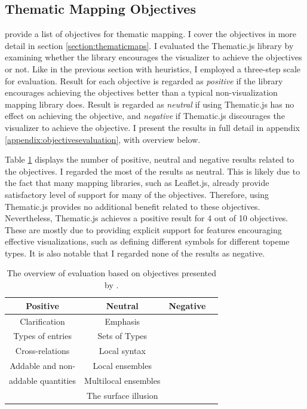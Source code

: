 \subsection{Thematic Mapping Objectives}

\citet{schlichtmann_visualization_2002} provide a list of objectives for thematic mapping. I cover the objectives in more detail in section \ref{section:thematicmaps}. I evaluated the Thematic.js library by examining whether the library encourages the visualizer to achieve the objectives or not. Like in the previous section with heuristics, I employed a three-step scale for evaluation. Result for each objective is regarded as \emph{positive} if the library encourages achieving the objectives better than a typical non-visualization mapping library does. Result is regarded as \emph{neutral} if using Thematic.js has no effect on achieving the objective, and \emph{negative} if Thematic.js discourages the visualizer to achieve the objective. I present the results in full detail in appendix \ref{appendix:objectivesevaluation}, with overview below.

Table \ref{table:objectivesevaluationoverview} displays the number of positive, neutral and negative results related to the objectives. I regarded the most of the results as neutral. This is likely due to the fact that many mapping libraries, such as Leaflet.js, already provide satisfactory level of support for many of the objectives. Therefore, using Thematic.js provides no additional benefit related to these objectives. Nevertheless, Thematic.js achieves a positive result for 4 out of 10 objectives. These are mostly due to providing explicit support for features encouraging effective visualizations, such as defining different symbols for different topeme types. It is also notable that I regarded none of the results as negative.

\begin{table}[htb]
\centering
\begin{tabular}{|c|c|c|c|}
\hline
\textbf{Positive} & \textbf{Neutral} & \textbf{Negative} \\ 
\hline
Clarification & Emphasis & \\
Types of entries & Sets of Types & \\
Cross-relations & Local syntax & \\
Addable and non- & Local ensembles & \\
addable quantities & Multilocal ensembles & \\
& The surface illusion & \\
\hline
\end{tabular}
\caption{The overview of evaluation based on objectives presented by \citet{schlichtmann_visualization_2002}.}
\label{table:objectivesevaluationoverview}
\end{table}


